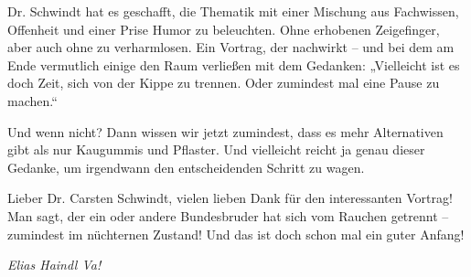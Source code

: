 \begin{multicols}{2}
Dr. Schwindt hat es geschafft, die
Thematik mit einer Mischung aus Fachwissen, Offenheit und einer Prise Humor zu
beleuchten. Ohne erhobenen Zeigefinger, aber auch ohne zu verharmlosen. Ein
Vortrag, der nachwirkt – und bei dem am Ende vermutlich einige den Raum
verließen mit dem Gedanken: „Vielleicht ist es doch Zeit, sich von der Kippe zu
trennen. Oder zumindest mal eine Pause zu machen.“

Und wenn nicht? Dann wissen wir jetzt
zumindest, dass es mehr Alternativen gibt als nur Kaugummis und Pflaster. Und
vielleicht reicht ja genau dieser Gedanke, um irgendwann den entscheidenden
Schritt zu wagen.

Lieber Dr. Carsten Schwindt, vielen lieben
Dank für den interessanten Vortrag! Man sagt, der ein oder andere Bundesbruder
hat sich vom Rauchen getrennt – zumindest im nüchternen Zustand! Und das ist
doch schon mal ein guter Anfang!

	\begin{flushright}
		\hfill\emph{Elias Haindl Va!}
	\end{flushright}


\end{multicols}
